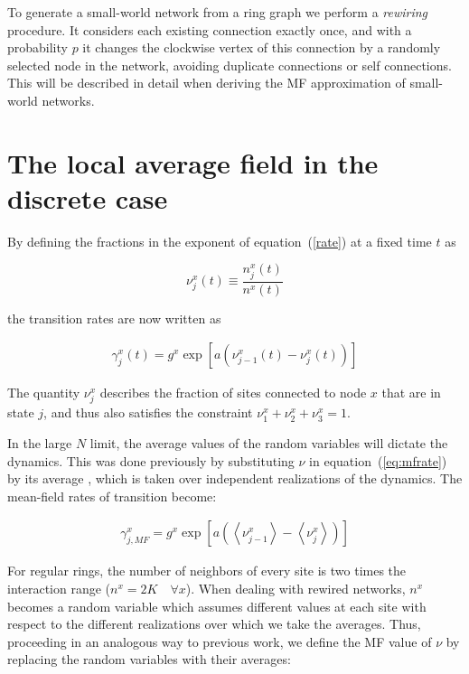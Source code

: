 To generate a small-world network from a ring graph we perform a \textit{rewiring} procedure. It considers each existing connection
exactly once, and with a probability $p$ it changes the clockwise vertex of this connection by a randomly selected node in the network,
avoiding duplicate connections or self connections. This will be described in detail when deriving the MF approximation of small-world
networks.

\section{The local average field in the discrete case}

By defining the fractions in the exponent of equation~(\ref{rate}) at a fixed time $t$ as

\begin{equation}
    \nu^x_j(t) \equiv \frac{n^x_j(t)}{n^x(t)}
\end{equation}

\noindent the transition rates are now written as

\begin{align}
    \gamma^x_j(t) = g^x\exp\left[ a(\nu^x_{j-1}(t) - \nu^x_j(t)) \right]
    \label{eq:mfrate}
\end{align}

The quantity $\nu^x_j$ describes the fraction of sites connected to node $x$ that are in state $j$, and thus also satisfies the
constraint $\nu^x_1+\nu^x_2+\nu^x_3=1$.

In the large $N$ limit, the average values of the random variables will dictate the dynamics. This was done previously by substituting
$\nu$ in equation~(\ref{eq:mfrate}) by its average \cite{escaff2014arrays}, which is taken over independent realizations of the
dynamics.  The mean-field rates of transition become:

\begin{align}
    \gamma^x_{j,MF} = g^x \exp \left[ a \left( \left< \nu^x_{j-1} \right> - \left< \nu^x_j \right> \right) \right]
    \label{gammaMF}
\end{align}

For regular rings, the number of neighbors of every site is two times the interaction range ($n^x = 2K \quad \forall x$). When dealing
with rewired networks, $n^x$ becomes a random variable which assumes different values at each site with respect to the different
realizations over which we take the averages. Thus, proceeding in an analogous way to previous work, we define the MF value of $\nu$ by
replacing the random variables with their averages:

